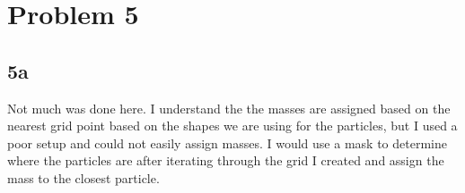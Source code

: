 \section{Problem 5}
\subsection{5a}


Not much was done here. I understand the the masses are assigned based on the
nearest grid point based on the shapes we are using for the particles, but
I used a poor setup and could not easily assign masses. I would use a mask
to determine where the particles are after iterating through the grid I
created and assign the mass to the closest particle.
